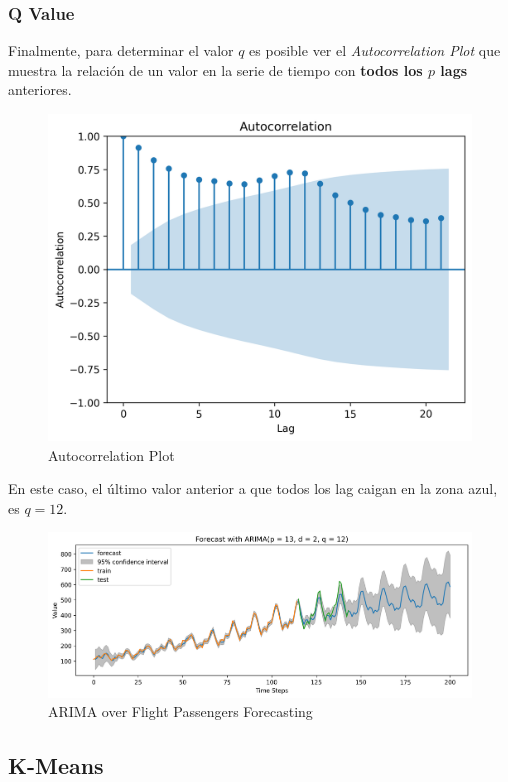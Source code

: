 \subsubsection{Q Value}
Finalmente, para determinar el valor $q$ es posible ver el \textit{Autocorrelation Plot} que muestra la relación de un valor en la serie de tiempo con \textbf{todos los $p$ lags} anteriores. 
\begin{figure}[H]
    \center
    \includegraphics[scale=0.5]{notebooks/ML/img/autocorrelation.png}
    \caption{Autocorrelation Plot}
\end{figure}
En este caso, el último valor anterior a que todos los lag caigan en la zona azul, es $q=12$.
\begin{figure}[H]
    \center
    \includegraphics[scale=0.5]{notebooks/ML/img/arima_results.png}
    \caption{ARIMA over Flight Passengers Forecasting}
\end{figure}

\subsection{K-Means}

